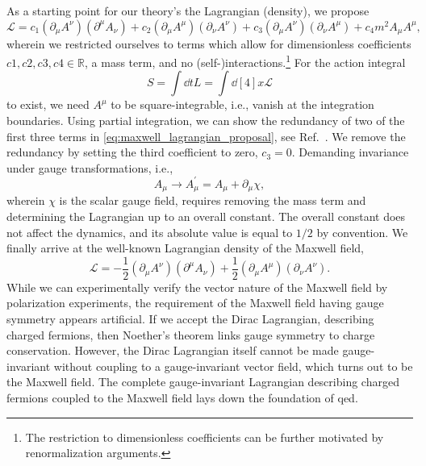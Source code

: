 As a starting point for our theory's the Lagrangian (density), we propose
\begin{equation}
	\mathcal{L}
	=
	c_1
	\left(
		\partial_\mu
		A^\nu
	\right)
	\left(
		\partial^\mu
		A_\nu
	\right)
	+
	c_2
	\left(
		\partial_\mu
		A^\mu
	\right)
	\left(
		\partial_\nu
		A^\nu
	\right)
	+
	c_3
	\left(
		\partial_\mu
		A^\nu
	\right)
	\left(
		\partial_\nu
		A^\mu
	\right)
	+
	c_4
	m^2
	A_\mu A^\mu
	\label{eq:maxwell_lagrangian_proposal},
\end{equation}
wherein we restricted ourselves to terms which allow for dimensionless coefficients $c1,c2,c3,c4\in\mathbb{R}$, a mass term, and no (self-)interactions.\footnote{The restriction to dimensionless coefficients can be further motivated by renormalization arguments.}
For the action integral
\begin{equation}
	S
	=
	\int\dd{t}
	L
	=
	\int\dd[4]{x}
	\mathcal{L}
\end{equation}
to exist, we need $A^\mu$ to be square-integrable, i.e., vanish at the integration boundaries.
Using partial integration, we can show the redundancy of two of the first three terms in \cref{eq:maxwell_lagrangian_proposal}, see Ref.~\cite{deRham2014}.
We remove the redundancy by setting the third coefficient to zero, $c_3=0$.
Demanding invariance under gauge transformations, i.e.,
\begin{equation}
	A_\mu
	\to
	A_\mu^\prime
	=
	A_\mu
	+
	\partial_\mu\chi
	,
\end{equation}
wherein $\chi$ is the scalar gauge field, requires removing the mass term and determining the Lagrangian up to an overall constant.
The overall constant does not affect the dynamics, and its absolute value is equal to $1/2$ by convention.
We finally arrive at the well-known Lagrangian density of the Maxwell field,
\begin{equation}
	\mathcal{L}
	=
	-
	\frac{1}{2}
	\left(
		\partial_\mu
		A^\nu
	\right)
	\left(
		\partial^\mu
		A_\nu
	\right)
	+
	\frac{1}{2}
	\left(
		\partial_\mu
		A^\mu
	\right)
	\left(
		\partial_\nu
		A^\nu
	\right)
	\label{eq:maxwell_lagrangian_field}
	.
\end{equation}
While we can experimentally verify the vector nature of the Maxwell field by polarization experiments, the requirement of the Maxwell field having gauge symmetry appears artificial.
If we accept the Dirac Lagrangian, describing charged fermions, then Noether's theorem links gauge symmetry to charge conservation.
However, the Dirac Lagrangian itself cannot be made gauge-invariant without coupling to a gauge-invariant vector field, which turns out to be the Maxwell field.
The complete gauge-invariant Lagrangian describing charged fermions coupled to the Maxwell field lays down the foundation of \gls{qed}.

